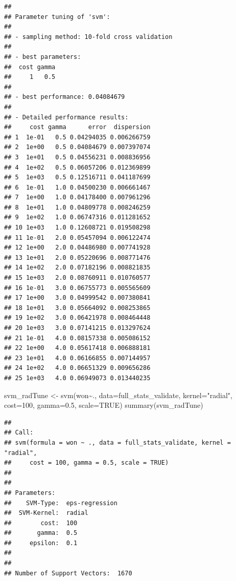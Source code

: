 \documentclass[
]{article}
\newenvironment{Shaded}{\begin{snugshade}}{\end{snugshade}}
\newcommand{\AttributeTok}[1]{\textcolor[rgb]{0.77,0.63,0.00}{#1}}
\newcommand{\ConstantTok}[1]{\textcolor[rgb]{0.00,0.00,0.00}{#1}}
\newcommand{\DecValTok}[1]{\textcolor[rgb]{0.00,0.00,0.81}{#1}}
\newcommand{\FloatTok}[1]{\textcolor[rgb]{0.00,0.00,0.81}{#1}}
\newcommand{\FunctionTok}[1]{\textcolor[rgb]{0.00,0.00,0.00}{#1}}
\newcommand{\NormalTok}[1]{#1}
\newcommand{\OtherTok}[1]{\textcolor[rgb]{0.56,0.35,0.01}{#1}}
\newcommand{\SpecialCharTok}[1]{\textcolor[rgb]{0.00,0.00,0.00}{#1}}
\newcommand{\StringTok}[1]{\textcolor[rgb]{0.31,0.60,0.02}{#1}}
\begin{document}
\begin{verbatim}
## 
## Parameter tuning of 'svm':
## 
## - sampling method: 10-fold cross validation 
## 
## - best parameters:
##  cost gamma
##     1   0.5
## 
## - best performance: 0.04084679 
## 
## - Detailed performance results:
##     cost gamma      error  dispersion
## 1  1e-01   0.5 0.04294035 0.006266759
## 2  1e+00   0.5 0.04084679 0.007397074
## 3  1e+01   0.5 0.04556231 0.008836956
## 4  1e+02   0.5 0.06057206 0.012369899
## 5  1e+03   0.5 0.12516711 0.041187699
## 6  1e-01   1.0 0.04500230 0.006661467
## 7  1e+00   1.0 0.04178400 0.007961296
## 8  1e+01   1.0 0.04809778 0.008246259
## 9  1e+02   1.0 0.06747316 0.011281652
## 10 1e+03   1.0 0.12608721 0.019508298
## 11 1e-01   2.0 0.05457094 0.006122474
## 12 1e+00   2.0 0.04486980 0.007741928
## 13 1e+01   2.0 0.05220696 0.008771476
## 14 1e+02   2.0 0.07182196 0.008821835
## 15 1e+03   2.0 0.08760911 0.010760577
## 16 1e-01   3.0 0.06755773 0.005565609
## 17 1e+00   3.0 0.04999542 0.007380841
## 18 1e+01   3.0 0.05664092 0.008253865
## 19 1e+02   3.0 0.06421978 0.008464448
## 20 1e+03   3.0 0.07141215 0.013297624
## 21 1e-01   4.0 0.08157338 0.005086152
## 22 1e+00   4.0 0.05617418 0.006888181
## 23 1e+01   4.0 0.06166855 0.007144957
## 24 1e+02   4.0 0.06651329 0.009656286
## 25 1e+03   4.0 0.06949073 0.013440235
\end{verbatim}

\begin{Shaded}
\begin{Highlighting}[]
\NormalTok{svm\_radTune }\OtherTok{\textless{}{-}} \FunctionTok{svm}\NormalTok{(won}\SpecialCharTok{\textasciitilde{}}\NormalTok{., }\AttributeTok{data=}\NormalTok{full\_stats\_validate, }\AttributeTok{kernel=}\StringTok{"radial"}\NormalTok{, }\AttributeTok{cost=}\DecValTok{100}\NormalTok{, }\AttributeTok{gamma=}\FloatTok{0.5}\NormalTok{, }\AttributeTok{scale=}\ConstantTok{TRUE}\NormalTok{)}
\FunctionTok{summary}\NormalTok{(svm\_radTune)}
\end{Highlighting}
\end{Shaded}

\begin{verbatim}
## 
## Call:
## svm(formula = won ~ ., data = full_stats_validate, kernel = "radial", 
##     cost = 100, gamma = 0.5, scale = TRUE)
## 
## 
## Parameters:
##    SVM-Type:  eps-regression 
##  SVM-Kernel:  radial 
##        cost:  100 
##       gamma:  0.5 
##     epsilon:  0.1 
## 
## 
## Number of Support Vectors:  1670
\end{verbatim}
\end{document}
